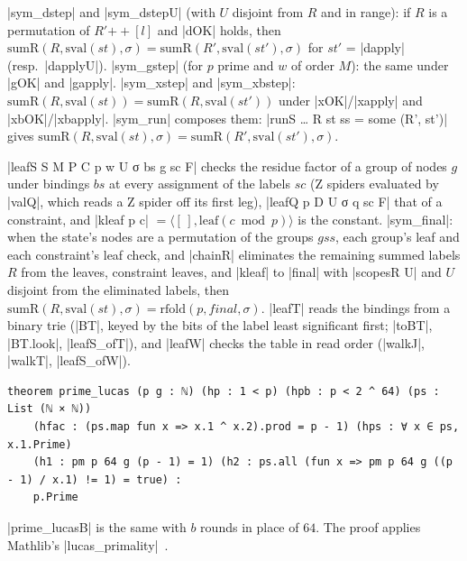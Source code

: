 \begin{theorem}\label{thm:lean-core-sym-steps}
\lean|sym_dstep| and \lean|sym_dstepU| (with $U$ disjoint from $R$ and in range): if $R$ is a permutation of $R'\mathbin{+\!\!+}[l]$ and \lean|dOK| holds, then $\mathrm{sumR}(R,\mathrm{sval}(st),\sigma)=\mathrm{sumR}(R',\mathrm{sval}(st'),\sigma)$ for $st'$ = \lean|dapply| (resp.\ \lean|dapplyU|). \lean|sym_gstep| (for $p$ prime and $w$ of order $M$): the same under \lean|gOK| and \lean|gapply|. \lean|sym_xstep| and \lean|sym_xbstep|: $\mathrm{sumR}(R,\mathrm{sval}(st))=\mathrm{sumR}(R,\mathrm{sval}(st'))$ under \lean|xOK|/\lean|xapply| and \lean|xbOK|/\lean|xbapply|. \lean|sym_run| composes them: \lean|runS … R st ss = some (R', st')| gives $\mathrm{sumR}(R,\mathrm{sval}(st),\sigma)=\mathrm{sumR}(R',\mathrm{sval}(st'),\sigma)$.
\end{theorem}

\begin{theorem}\label{thm:lean-core-sym-final}
\lean|leafS S M P C p w U σ bs g sc F| checks the residue factor of a group of nodes $g$ under bindings $bs$ at every assignment of the labels $sc$ (Z spiders evaluated by \lean|valQ|, which reads a Z spider off its first leg), \lean|leafQ p D U σ q sc F| that of a constraint, and \lean|kleaf p c| $=\langle[\,],\mathrm{leaf}(c\bmod p)\rangle$ is the constant. \lean|sym_final|: when the state's nodes are a permutation of the groups $gss$, each group's leaf and each constraint's leaf check, and \lean|chainR| eliminates the remaining summed labels $R$ from the leaves, constraint leaves, and \lean|kleaf| to \lean|final| with \lean|scopesR U| and $U$ disjoint from the eliminated labels, then $\mathrm{sumR}(R,\mathrm{sval}(st),\sigma)=\mathrm{rfold}(p,\mathit{final},\sigma)$. \lean|leafT| reads the bindings from a binary trie (\lean|BT|, keyed by the bits of the label least significant first; \lean|toBT|, \lean|BT.look|, \lean|leafS_ofT|), and \lean|leafW| checks the table in read order (\lean|walkJ|, \lean|walkT|, \lean|leafS_ofW|).
\end{theorem}

\begin{theorem}\label{thm:lean-core-prime-lucas}
\begin{lstlisting}[style=lean]
theorem prime_lucas (p g : ℕ) (hp : 1 < p) (hpb : p < 2 ^ 64) (ps : List (ℕ × ℕ))
    (hfac : (ps.map fun x => x.1 ^ x.2).prod = p - 1) (hps : ∀ x ∈ ps, x.1.Prime)
    (h1 : pm p 64 g (p - 1) = 1) (h2 : ps.all (fun x => pm p 64 g ((p - 1) / x.1) != 1) = true) :
    p.Prime
\end{lstlisting}
\lean|prime_lucasB| is the same with $b$ rounds in place of $64$. The proof applies Mathlib's \lean|lucas_primality|~\cite{lucas1878theorie}.
\end{theorem}

